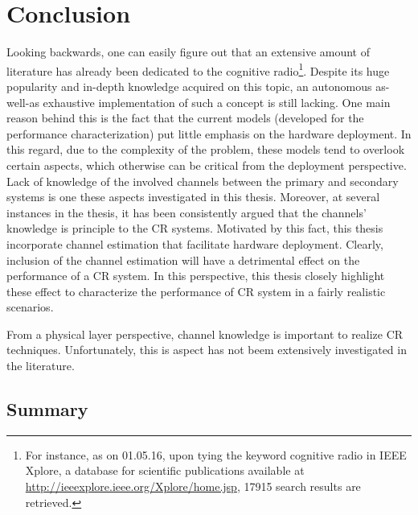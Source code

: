 \chapter{Conclusion}
\label{chap:Con}

Looking backwards, one can easily figure out that an extensive amount of literature has already been dedicated to the cognitive radio\footnote{For instance, as on 01.05.16, upon tying the keyword cognitive radio in IEEE Xplore, a database for scientific publications available at \url{http://ieeexplore.ieee.org/Xplore/home.jsp}, 17915 search results are retrieved.}. Despite its huge popularity and in-depth knowledge acquired on this topic, an autonomous as-well-as exhaustive implementation of such a concept is still lacking. One main reason behind this is the fact that the current models (developed for the performance characterization) put little emphasis on the hardware deployment. In this regard, due to the complexity of the problem, these models tend to overlook certain aspects, which otherwise can be critical from the deployment perspective. Lack of knowledge of the involved channels between the primary and secondary systems is one these aspects investigated in this thesis. Moreover, at several instances in the thesis, it has been consistently argued that the channels' knowledge is principle to the CR systems. Motivated by this fact, this thesis incorporate channel estimation that facilitate hardware deployment. Clearly, inclusion of the channel estimation will have a detrimental effect on the performance of a CR system. In this perspective, this thesis closely highlight these effect to characterize the performance of CR system in a fairly realistic scenarios. 

From a physical layer perspective, channel knowledge is important to realize CR techniques. Unfortunately, this is aspect has not beem extensively investigated in the literature. 

\section{Summary}


